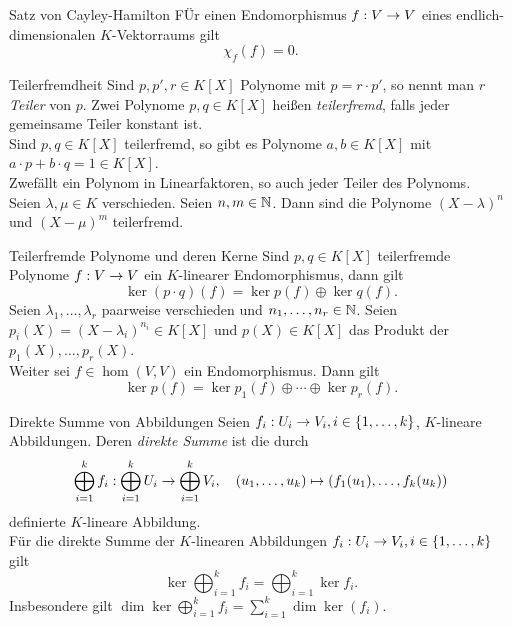 \documentclass[main.tex]{subfiles}
\begin{document}
\begin{karte}{Satz von Cayley-Hamilton}
    FÜr einen Endomorphismus \( f : V \rightarrow V \) eines endlich-dimensionalen 
    \( K \)-Vektorraums gilt 
    \[ \chi_f(f) = 0. \]
\end{karte}

\begin{karte}{Teilerfremdheit}
    Sind \( p, p', r\in K[X] \) Polynome mit \( p = r \cdot p' \), 
    so nennt man \(r\) \textit{Teiler} von \(p\). Zwei Polynome \(p,q\in K[X]\) heißen 
    \textit{teilerfremd}, falls jeder gemeinsame Teiler konstant ist.\\
    Sind \( p, q\in K[X] \) teilerfremd, so gibt es Polynome \( a,b\in K[X] \) 
    mit \( a\cdot p + b \cdot q = 1 \in K[X] \).\\
    Zwefällt ein Polynom in Linearfaktoren, so auch jeder Teiler des Polynoms.\\
    Seien \( \lambda, \mu \in K \) verschieden. Seien \(n,m\in \mathbb{N}\). Dann sind die 
    Polynome \( (X - \lambda)^n \) und \( (X - \mu)^m \) teilerfremd.
\end{karte}

\begin{karte}{Teilerfremde Polynome und deren Kerne}
    Sind \( p,q\in K[X] \) teilerfremde Polynome \( f : V \rightarrow V \) 
    ein \(K\)-linearer Endomorphismus, dann gilt 
    \[ \ker(p\cdot q)(f) = \ker p(f) \oplus \ker q(f). \]
    Seien \( \lambda_1, \ldots, \lambda_r \) paarweise verschieden und 
    \( n_1,\ldots,n_r \in \mathbb{N} \). Seien \( p_i(X) = (X - \lambda_i)^{n_i} 
    \in K[X] \) und \( p(X) \in K[X] \) das Produkt der \( p_1(X), \ldots,p_r(X) \). \\
    Weiter sei \( f\in \hom(V,V) \) ein Endomorphismus. Dann gilt 
    \[ \ker p(f) = \ker p_1(f) \oplus \cdots \oplus \ker p_r(f). \]
\end{karte}

\begin{karte}{Direkte Summe von Abbildungen}
    Seien \( f_i : U_i \rightarrow V_i, i \in \{1,\ldots,k\} \), 
    \(K\)-lineare Abbildungen. Deren \textit{direkte Summe} ist die durch 
    \[  \bigoplus_{i=1}^k f_i  :  \bigoplus_{i=1}^k U_i  \rightarrow  \bigoplus_{i=1}^k V_i , \quad
    (u_1,\ldots, u_k) \mapsto (f_1(u_1), \ldots, f_k(u_k)) \]
    definierte \(K\)-lineare Abbildung.\\
    Für die direkte Summe der \(K\)-linearen Abbildungen 
    \( f_i : U_i \rightarrow V_i, i \in \{1,\ldots,k\} \) gilt 
    \[ \ker \bigoplus_{i=1}^k f_i = \bigoplus_{i=1}^k \ker f_i. \]
    Insbesondere gilt 
    \( \dim \ker \bigoplus_{i=1}^k f_i = \sum_{i=1}^k \dim \ker(f_i) \).
\end{karte}
\end{document}
